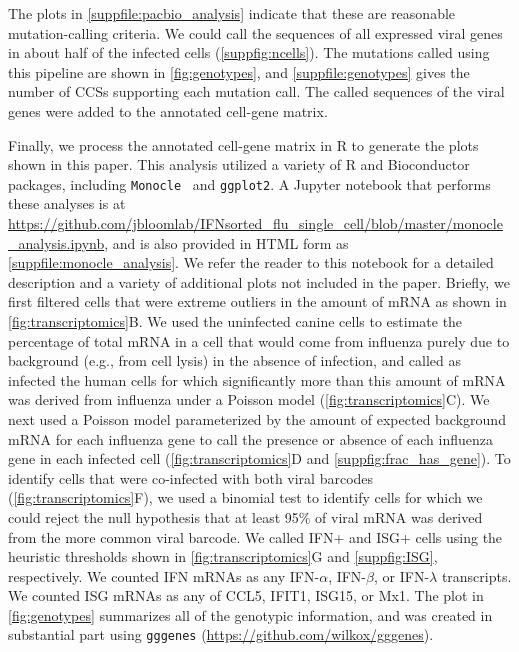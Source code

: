\documentclass[]{asm-article}
\newcommand{\FIG}[1]{\autoref{fig:#1}}
\newcommand{\SUPPFILE}[1]{\autoref{suppfile:#1}}
\newcommand{\SUPPFIG}[1]{\autoref{suppfig:#1}}
\begin{document}
The plots in \SUPPFILE{pacbio_analysis} indicate that these are reasonable mutation-calling criteria.
We could call the sequences of all expressed viral genes in about half of the infected cells (\SUPPFIG{ncells}).
The mutations called using this pipeline are shown in \FIG{genotypes}, and \SUPPFILE{genotypes} gives the number of CCSs supporting each mutation call.
The called sequences of the viral genes were added to the annotated cell-gene matrix.

Finally, we process the annotated cell-gene matrix in R to generate the plots shown in this paper.
This analysis utilized a variety of R and Bioconductor~\cite{huber2015orchestrating} packages, including \texttt{Monocle}~\cite{qiu2017reversed, trapnell2014dynamics} and \texttt{ggplot2}.
A Jupyter notebook that performs these analyses is at \url{https://github.com/jbloomlab/IFNsorted_flu_single_cell/blob/master/monocle_analysis.ipynb}, and is also provided in HTML form as \SUPPFILE{monocle_analysis}.
We refer the reader to this notebook for a detailed description and a variety of additional plots not included in the paper.
Briefly, we first filtered cells that were extreme outliers in the amount of mRNA as shown in \FIG{transcriptomics}B.
We used the uninfected canine cells to estimate the percentage of total mRNA in a cell that would come from influenza purely due to background (e.g., from cell lysis) in the absence of infection, and called as infected the human cells for which significantly more than this amount of mRNA was derived from influenza under a Poisson model (\FIG{transcriptomics}C).
We next used a Poisson model parameterized by the amount of expected background mRNA for each influenza gene to call the presence or absence of each influenza gene in each infected cell (\FIG{transcriptomics}D and \SUPPFIG{frac_has_gene}). 
To identify cells that were co-infected with both viral barcodes (\FIG{transcriptomics}F), we used a binomial test to identify cells for which we could reject the null hypothesis that at least 95\% of viral mRNA was derived from the more common viral barcode.
We called IFN+ and ISG+ cells using the heuristic thresholds shown in \FIG{transcriptomics}G and \SUPPFIG{ISG}, respectively.
We counted IFN mRNAs as any IFN-$\alpha$, IFN-$\beta$, or IFN-$\lambda$ transcripts.
We counted ISG mRNAs as any of CCL5, IFIT1, ISG15, or Mx1.
The plot in \FIG{genotypes} summarizes all of the genotypic information, and was created in substantial part using \texttt{gggenes} (\url{https://github.com/wilkox/gggenes}).
\end{document}
